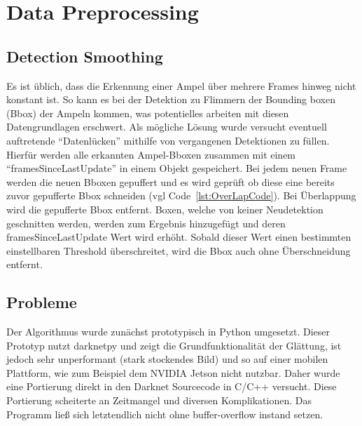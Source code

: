 \documentclass[a4paper,oneside,12pt]{report}
\begin{document}
	\chapter{Data Preprocessing}
	\begin{onehalfspace}
		\section{Detection Smoothing}
		Es ist üblich, dass die Erkennung einer Ampel über mehrere Frames hinweg nicht konstant ist. So kann es bei der Detektion zu Flimmern der Bounding boxen (Bbox) der Ampeln kommen, was potentielles arbeiten mit diesen Datengrundlagen erschwert.\newline
		Als mögliche Lösung wurde versucht eventuell auftretende "`Datenlücken"' mithilfe von vergangenen Detektionen zu füllen. Hierfür werden alle erkannten Ampel-Bboxen zusammen mit einem "`framesSinceLastUpdate"' in einem Objekt gespeichert. Bei jedem neuen Frame werden die neuen Bboxen gepuffert und es wird geprüft ob diese eine bereits zuvor gepufferte Bbox schneiden (vgl Code~\ref{lst:OverLapCode}). Bei Überlappung wird die gepufferte Bbox entfernt. Boxen, welche von keiner Neudetektion geschnitten werden, werden zum Ergebnis hinzugefügt und deren framesSinceLastUpdate Wert wird erhöht. Sobald dieser Wert einen bestimmten einstellbaren Threshold überschreitet, wird die Bbox auch ohne Überschneidung entfernt.
		
		\section{Probleme}
		Der Algorithmus wurde zunächst prototypisch in Python umgesetzt. Dieser Prototyp nutzt darknetpy und zeigt die Grundfunktionalität der Glättung, ist jedoch sehr unperformant (stark stockendes Bild) und so auf einer mobilen Plattform, wie zum Beispiel dem NVIDIA Jetson nicht nutzbar. Daher wurde eine Portierung direkt in den Darknet Sourcecode in C/C++ versucht. Diese Portierung scheiterte an Zeitmangel und diversen Komplikationen. Das Programm ließ sich letztendlich nicht ohne buffer-overflow instand setzen.
	\end{onehalfspace}
\end{document}
